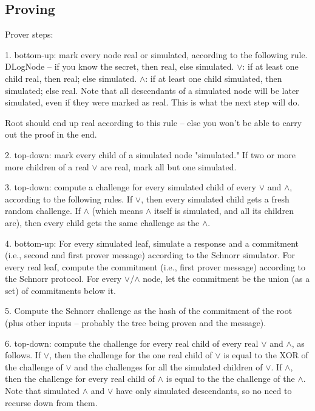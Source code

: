\documentclass[]{llncs}
\newcommand{\authnote}[2]{\marginpar{\parbox{\marginparwidth}{\tiny %
  \textsf{#1 {\textcolor{blue}{notes: #2}}}}}%
  \textcolor{blue}{\textbf{\dag}}}
\newcommand{\authnote}[2]{
  \textsf{#1 \textcolor{blue}{: #2}}}
\newcommand{\authnote}[2]{}
\newcommand{\knote}[1]{{\authnote{\textcolor{green}{kushti notes}}{#1}}}
\begin{document}
\subsection{Proving}
\label{sec:proving}

\knote{Raw text from Leo's email, rewrite}

Prover steps:
    
    1. bottom-up: mark every node real or simulated, according to the following rule. DLogNode -- if you know the secret,
     then real, else simulated. $\lor$: if at least one child real, then real; else simulated. $\land$: if at least one child
     simulated, then simulated; else real. Note that all descendants of a simulated node will be later simulated, even
     if they were marked as real. This is what the next step will do.
    
     Root should end up real according to this rule -- else you won't be able to carry out the proof in the end.
    
    2. top-down: mark every child of a simulated node "simulated." If two or more more children of a real $\lor$ are real,
     mark all but one simulated.
    
    3. top-down: compute a challenge for every simulated child of every $\lor$ and $\land$, according to the following rules.
     If $\lor$, then every simulated child gets a fresh random challenge. If $\land$ (which means $\land$ itself is simulated, and
     all its children are), then every child gets the same challenge as the $\land$.
    
    4. bottom-up: For every simulated leaf, simulate a response and a commitment (i.e., second and first prover message)
     according to the Schnorr simulator. For every real leaf, compute the commitment (i.e., first prover message) according
     to the Schnorr protocol. For every $\lor$/$\land$ node, let the commitment be the union (as a set) of commitments below it.
    
    5. Compute the Schnorr challenge as the hash of the commitment of the root (plus other inputs -- probably the tree
     being proven and the message).
    
    6. top-down: compute the challenge for every real child of every real $\lor$ and $\land$, as follows. If $\lor$, then the
     challenge for the one real child of $\lor$ is equal to the XOR of the challenge of $\lor$ and the challenges for all the
     simulated children of $\lor$. If $\land$, then the challenge for every real child of $\land$ is equal to the the challenge of
     the $\land$. Note that simulated $\land$ and $\lor$ have only simulated descendants, so no need to recurse down from them.
\end{document}
